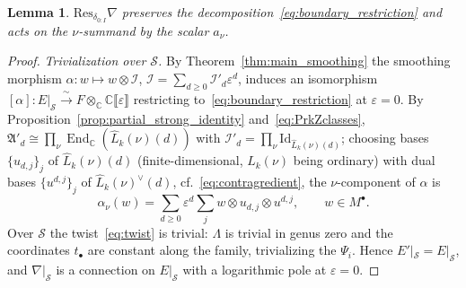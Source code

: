 \documentclass[12pt,a4paper,reqno]{amsart}
\numberwithin{equation}{section}
\newtheorem{lemma}[theorem]{Lemma}
\theoremstyle{definition}
\newcommand{\End}{\operatorname{End}}
\newcommand{\C}{\mathbb{C}}
\renewcommand{\S}{\mathcal{S}}
\newcommand{\I}{\mathscr{I}}
\newcommand{\lb}{\llbracket}
\newcommand{\rb}{\rrbracket}
\def\o{\otimes}
\def\fA{\mathfrak{A}}
\def\Id{\mathrm{Id}}
\def\Res{\mathrm{Res}}
\begin{document}
\begin{lemma}\label{lm:residue}
$\Res_{\delta_{0:I}}\nabla$ preserves the decomposition~\eqref{eq:boundary_restriction} and acts on the $\nu$-summand by the scalar $a_\nu$.
\end{lemma}
\begin{proof}
\emph{Trivialization over $\S$.} By Theorem~\ref{thm:main_smoothing} the smoothing morphism $\alpha:w\mapsto w\o\I$, $\I=\sum_{d\geq0}\I'_d\varepsilon^d$, induces an isomorphism $[\alpha]:E|_\S\xrightarrow{\ \sim\ }F\o_\C\C\lb\varepsilon\rb$ restricting to~\eqref{eq:boundary_restriction} at $\varepsilon=0$. By Proposition~\ref{prop:partial_strong_identity} and~\eqref{eq:PrkZclasses}, $\fA'_d\cong\prod_{\nu}\End_\C(\hat{L}_k(\nu)(d))$ with $\I'_d=\prod_\nu\Id_{\hat{L}_k(\nu)(d)}$; choosing bases $\{u_{d,j}\}_j$ of $\hat{L}_k(\nu)(d)$ (finite-dimensional, $\hat{L}_k(\nu)$ being ordinary) with dual bases $\{u^{d,j}\}_j$ of $\hat{L}_k(\nu)^\vee(d)$, cf.~\eqref{eq:contragredient}, the $\nu$-component of $\alpha$ is
\begin{equation}\label{eq:alpha_nu}
\alpha_\nu(w)=\sum_{d\geq0}\varepsilon^{d}\sum_j w\o u_{d,j}\o u^{d,j},\qquad w\in M^\bullet.
\end{equation}
Over $\S$ the twist~\eqref{eq:twist} is trivial: $\Lambda$ is trivial in genus zero and the coordinates $t_\bullet$ are constant along the family, trivializing the $\Psi_i$. Hence $E'|_\S=E|_\S$, and $\nabla|_\S$ is a connection on $E|_\S$ with a logarithmic pole at $\varepsilon=0$.


\end{proof}
\end{document}
